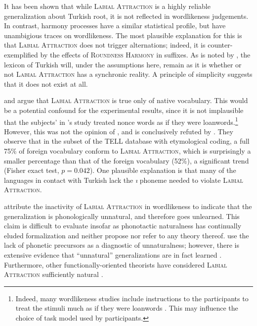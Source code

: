It has been shown that while \textsc{Labial Attraction} is a highly reliable generalization about Turkish root, it is not reflected in wordlikeness judgements. In contrast, harmony processes have a similar statistical profile, but have unambigious traces on wordlikeness. The most plausible explanation for this is that  \textsc{Labial Attraction} does not trigger alternations; indeed, it is counter-exemplified by the effects of \textsc{Roundness Harmony} in suffixes. As is noted by \citet[412f.]{Inkelas1997}, the lexicon of Turkish will, under the assumptions here, remain as it is whether or not \textsc{Labial Attraction} has a synchronic reality. A principle of simplicity suggests that it does not exist at all.

\citet{NiChiosain1993} and \citet{Ito1995b} argue that \textsc{Labial Attraction} is true only of native vocabulary. This would be a potential confound for the experimental results, since it is not implausible that the subjects' in \citeauthor{Zimmer1969}'s study treated nonce words as if they were loanwords.\footnote{Indeed, many wordlikeness studies include instructions to the participants to treat the stimuli much as if they were loanwords \citep[e.g.,][]{Hay2004a}. This may influence the choice of task model used by participants.} However, this was not the opinion of \citet[266]{Lees1966a}, and is conclusively refuted by  \citet{Inkelas2001}. They observe that in the subset of the TELL database with etymological coding, a full 75\% of foreign vocabulary conform to \textsc{Labial Attraction}, which is surprisingly a smaller percentage than that of the foreign vocabulary (52\%), a significant trend (Fisher exact test, $p = 0.042$). One plausible explanation is that many of the languages in contact with Turkish lack the \emph{ı} phoneme needed to violate \textsc{Labial Attraction}.

\citet{Becker2011} attribute the inactivity of \textsc{Labial Attraction} in wordlikeness to indicate that the generalization is phonologically unnatural, and therefore goes unlearned. This claim is difficult to evaluate insofar as phonotactic naturalness has continually eluded formalization and \citeauthor{Becker2011} neither propose nor refer to any theory thereof. \citeauthor{Becker2011} use the lack of phonetic precursors as a diagnostic of unnaturalness; however, there is extensive evidence that ``unnatural'' generalizations are in fact learned \citep[e.g.,][]{Anderson1981,Bach1972,Blevins2004,Buckley2000a,Hayes2009,Pierrehumbert2006c}. Furthermore, other functionally-oriented theorists have considered \textsc{Labial Attraction} sufficiently natural \citep[e.g.,][]{NiChiosain1993,Ito1993,Ito1995b}. 


